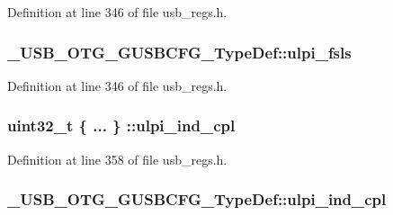 Definition at line 346 of file usb\-\_\-regs.\-h.

\hypertarget{group___u_s_b___o_t_g___d_r_i_v_e_r_ga11c23bdbb96fbbd770e234418b23ee98}{
\subsubsection[{ulpi\-\_\-fsls}]{ \-\_\-\-U\-S\-B\-\_\-\-O\-T\-G\-\_\-\-G\-U\-S\-B\-C\-F\-G\-\_\-\-Type\-Def\-::ulpi\-\_\-fsls}}\label{group___u_s_b___o_t_g___d_r_i_v_e_r_ga11c23bdbb96fbbd770e234418b23ee98}


Definition at line 346 of file usb\-\_\-regs.\-h.

\hypertarget{group___u_s_b___o_t_g___d_r_i_v_e_r_gad56ec53428704ce89d3b056784fd1b8e}{
\subsubsection[{ulpi\-\_\-ind\-\_\-cpl}]{\setlength{\rightskip}{0pt plus 5cm}uint32\-\_\-t \{ ... \} \-::ulpi\-\_\-ind\-\_\-cpl}}\label{group___u_s_b___o_t_g___d_r_i_v_e_r_gad56ec53428704ce89d3b056784fd1b8e}


Definition at line 358 of file usb\-\_\-regs.\-h.

\hypertarget{group___u_s_b___o_t_g___d_r_i_v_e_r_gafb061f37737372a6b6d9576a9b34585b}{
\subsubsection[{ulpi\-\_\-ind\-\_\-cpl}]{ \-\_\-\-U\-S\-B\-\_\-\-O\-T\-G\-\_\-\-G\-U\-S\-B\-C\-F\-G\-\_\-\-Type\-Def\-::ulpi\-\_\-ind\-\_\-cpl}}\label{group___u_s_b___o_t_g___d_r_i_v_e_r_gafb061f37737372a6b6d9576a9b34585b}


